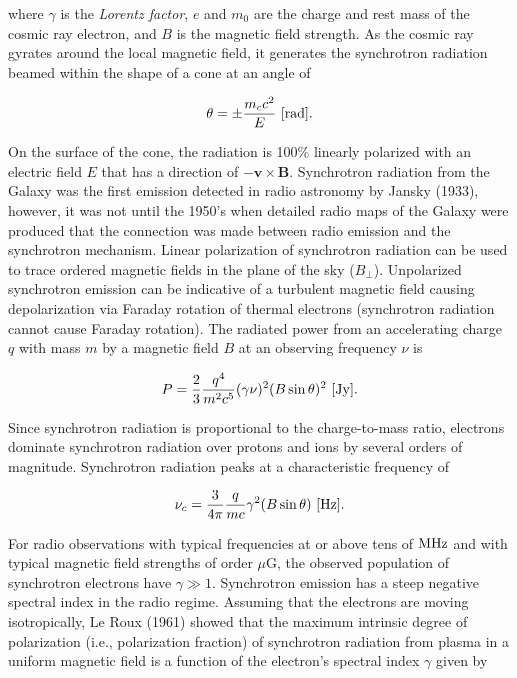 \documentclass[a4paper,11pt]{article}
\begin{document}
{\noindent}where $\gamma$ is the \textit{Lorentz factor}, $e$ and $m_0$ are the charge and rest mass of the cosmic ray electron, and $B$ is the magnetic field strength. As the cosmic ray gyrates around the local magnetic field, it generates the synchrotron radiation beamed within the shape of a cone at an angle of 

\begin{align*}
    \theta = \pm \frac{m_cc^2}{E} ~ [{\rm rad}].
\end{align*}

{\noindent}On the surface of the cone, the radiation is 100\% linearly polarized with an electric field $E$ that has a direction of $-\mathbf{v\times B}$. Synchrotron radiation from the Galaxy was the first emission detected in radio astronomy by Jansky (1933), however, it was not until the 1950's when detailed radio maps of the Galaxy were produced that the connection was made between radio emission and the synchrotron mechanism. Linear polarization of synchrotron radiation can be used to trace ordered magnetic fields in the plane of the sky ($B_\perp$). Unpolarized synchrotron emission can be indicative of a turbulent magnetic field causing depolarization via Faraday rotation of thermal electrons (synchrotron radiation cannot cause Faraday rotation). The radiated power from an accelerating charge $q$ with mass $m$ by a magnetic field $B$ at an observing frequency $\nu$ is

\begin{align*}
    P = \frac{2}{3}\dfrac{q^4}{m^2c^5}(\gamma\nu)^2(B\sin\theta)^2 ~ [{\rm Jy}].
\end{align*}

{\noindent}Since synchrotron radiation is proportional to the charge-to-mass ratio, electrons dominate synchrotron radiation over protons and ions by several orders of magnitude. Synchrotron radiation peaks at a characteristic frequency of

\begin{align*}
    \nu_c = \dfrac{3}{4\pi}\dfrac{q}{mc}\gamma^2(B\sin\theta)~[{\rm Hz}].
\end{align*}

{\noindent}For radio observations with typical frequencies at or above tens of ${\rm MHz}$ and with typical magnetic field strengths of order $\mu$G, the observed population of synchrotron electrons have $\gamma\gg1$. Synchrotron emission has a steep negative spectral index in the radio regime. Assuming that the electrons are moving isotropically, Le Roux (1961) showed that the maximum intrinsic degree of polarization (i.e., polarization fraction) of synchrotron radiation from plasma in a uniform magnetic field is a function of the electron's spectral index $\gamma$ given by
\end{document}
